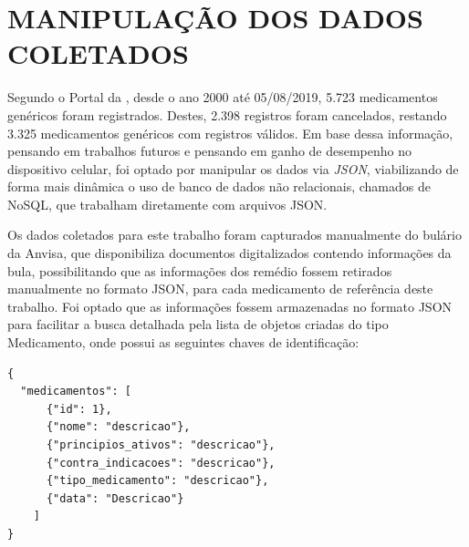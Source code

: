 \section{MANIPULAÇÃO DOS DADOS COLETADOS}

Segundo o Portal da , desde o ano 2000 até 05/08/2019, 5.723 medicamentos genéricos foram registrados. Destes, 2.398 registros foram cancelados, restando 3.325 medicamentos genéricos com registros válidos. Em base dessa informação, pensando em trabalhos futuros e pensando em ganho de desempenho no dispositivo celular, foi optado por manipular os dados via \textit{JSON}, viabilizando de forma mais dinâmica o uso de banco de dados não relacionais, chamados de NoSQL, que trabalham diretamente com arquivos JSON.

Os dados coletados para este trabalho foram capturados manualmente do bulário da Anvisa, que disponibiliza documentos digitalizados contendo informações da bula, possibilitando que as informações dos remédio fossem retirados manualmente no formato JSON, para cada medicamento de referência deste trabalho. Foi optado que as informações fossem armazenadas no formato JSON para facilitar a busca detalhada pela lista de objetos criadas do tipo Medicamento, onde possui as seguintes chaves de identificação:

\begin{lstlisting}[firstnumber=1]
{
  "medicamentos": [
      {"id": 1},
      {"nome": "descricao"},
      {"principios_ativos": "descricao"},
      {"contra_indicacoes": "descricao"},
      {"tipo_medicamento": "descricao"},
      {"data": "Descricao"}
    ]
}
\end{lstlisting}


